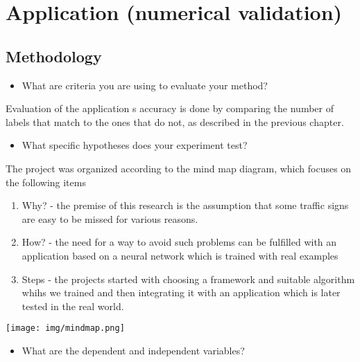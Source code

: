 \documentclass[runningheads,a4paper,11pt]{report}
\begin{document}
 




\chapter{Application (numerical validation)}
\label{chapter:application}

\section{Methodology}
\label{section:methodology}

\begin{itemize}
	\item What are criteria you are using to evaluate your method? 
\end{itemize}
	Evaluation of the application s accuracy is done by comparing the number of labels that match to the ones that do not, as described in the previous chapter. 

\begin{itemize}
	\item What specific hypotheses does your experiment test?
\end{itemize}

The project was organized according to the mind map diagram, which focuses on the following items
\begin{enumerate}
  \item Why? - the premise of this research is the assumption that some traffic signs are easy to be missed for various reasons.
  \item How? - the need for a way to avoid such problems can be fulfilled with an application based on a neural network which is trained with real examples
  \item Steps - the projects started with choosing a framework and suitable algorithm whihs we trained and then integrating it with an application which is later tested in the real world.
\end{enumerate}

\begin{landscape}
	\texttt{[image: img/mindmap.png]}
\end{landscape}


	
\begin{itemize}
	\item What are the dependent and independent variables? 
\end{itemize}
\end{document}
